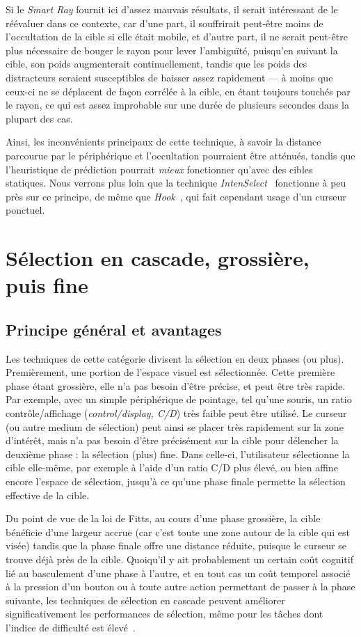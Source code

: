 	Si le \emph{Smart Ray} fournit ici d'assez mauvais résultats, il serait intéressant de le réévaluer dans ce contexte, car d'une part, il souffrirait peut-être moins de l'occultation de la cible si elle était mobile, et d'autre part, il ne serait peut-être plus nécessaire de bouger le rayon pour lever l'ambiguïté, puisqu'en suivant la cible, son poids augmenterait continuellement, tandis que les poids des distracteurs seraient susceptibles de baisser assez rapidement --- à moins que ceux-ci ne se déplacent de façon corrélée à la cible, en étant toujours touchés par le rayon, ce qui est assez improbable sur une durée de plusieurs secondes dans la plupart des cas.
	
	Ainsi, les inconvénients principaux de cette technique, à savoir la distance parcourue par le périphérique et l'occultation pourraient être atténués, tandis que l'heuristique de prédiction pourrait \emph{mieux} fonctionner qu'avec des cibles statiques. Nous verrons plus loin que la technique \emph{IntenSelect}~\cite{de2005intenselect} fonctionne à peu près sur ce principe, de même que \emph{Hook}~\cite{ortega2013hook}, qui fait cependant usage d'un curseur ponctuel.

\section{Sélection en cascade, grossière, puis fine}
	\subsection{Principe général et avantages}
	Les techniques de cette catégorie divisent la sélection en deux phases (ou plus). Premièrement, une portion de l'espace visuel est sélectionnée. Cette première phase étant grossière, elle n'a pas besoin d'être précise, et peut être très rapide. Par exemple, avec un simple périphérique de pointage, tel qu'une souris, un ratio contrôle/affichage (\emph{control/display, C/D}) très faible peut être utilisé. Le curseur (ou autre medium de sélection) peut ainsi se placer très rapidement sur la zone d'intérêt, mais n'a pas besoin d'être précisément sur la cible pour délencher la deuxième phase : la sélection (plus) fine. Dans celle-ci, l'utilisateur sélectionne la cible elle-même, par exemple à l'aide d'un ratio C/D plus élevé, ou bien affine encore l'espace de sélection, jusqu'à ce qu'une phase finale permette la sélection effective de la cible.
	 
	Du point de vue de la loi de Fitts, au cours d'une phase grossière, la cible bénéficie d'une largeur accrue (car c'est toute une zone autour de la cible qui est visée) tandis que la phase finale offre une distance réduite, puisque le curseur se trouve déjà près de la cible. Quoiqu'il y ait probablement un certain \og coût cognitif \fg{} lié au basculement d'une phase à l'autre, et en tout cas un coût temporel associé à la pression d'un bouton ou à toute autre action permettant de passer à la phase suivante, les techniques de sélection en cascade peuvent améliorer significativement les performances de sélection, même pour les tâches dont l'indice de difficulté est élevé~\cite{kopper2011rapid}.
	
